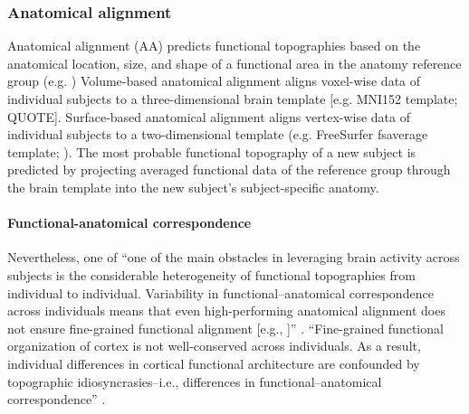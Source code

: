 \subsubsection{Anatomical alignment}




Anatomical alignment (AA) predicts functional topographies based on the
anatomical location, size, and shape of a functional area in the anatomy
reference group (e.g. \citet{weiner2018defining})
Volume-based anatomical alignment \citep{evans19933d} aligns voxel-wise data of
individual subjects to a three-dimensional brain template [e.g. MNI152 template;
QUOTE].
Surface-based anatomical alignment \citep{fischl1999cortical}  aligns
vertex-wise data of individual subjects to a two-dimensional template (e.g.
FreeSurfer fsaverage template; \citep{fischl1999high}).
%
The most probable functional topography of a new subject is predicted by
projecting averaged functional data of the reference group through the brain
template into the new subject's subject-specific anatomy.

\paragraph{Functional-anatomical correspondence}

%
Nevertheless, one of ``one of the main obstacles in leveraging brain activity
across subjects is the considerable heterogeneity of functional topographies
from individual to individual. Variability in functional--anatomical
correspondence across individuals means that even high-performing anatomical
alignment does not ensure fine-grained functional alignment [e.g.,
\citet{frost2012measuring}]'' \citep{kumar2020brainiak}.
%
``Fine-grained functional organization of cortex is not well-conserved across
individuals. As a result, individual differences in cortical functional
architecture are confounded by topographic idiosyncrasies--i.e., differences in
functional–anatomical correspondence'' \citep{feilong2018reliable}.

